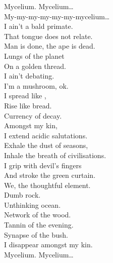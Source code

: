 
\label{album:ice-death-planets-mushrooms-lava}





Mycelium. Mycelium… \\
My-my-my-my-my-my-mycelium… \\

I ain't a bald primate. \\
That tongue does not relate. \\
Man is done, the ape is dead. \\
Lungs of the planet \\
On a golden thread. \\
I ain't debating. \\
I'm a mushroom, ok. \\
I spread like , \\
Rise like bread. \\
Currency of decay. \\

Amongst my kin, \\
I extend acidic salutations. \\
Exhale the dust of seasons, \\
Inhale the breath of civilisations. \\
I grip with devil's fingers \\
And stroke the green curtain. \\
We, the thoughtful element. \\

Dumb rock. \\
Unthinking ocean. \\
Network of the wood. \\
Tannin of the evening. \\
Synapse of the bush. \\
I disappear amongst my kin. \\

Mycelium. Mycelium… \\


